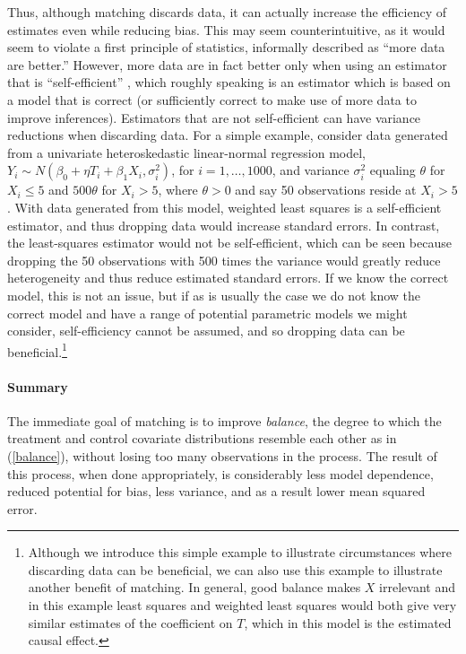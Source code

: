 \documentclass[11pt,titlepage]{article}
\begin{document}
Thus, although matching discards data, it can actually increase the
efficiency of estimates even while reducing bias.  This may seem
counterintuitive, as it would seem to violate a first principle of
statistics, informally described as ``more data are better.''
However, more data are in fact better only when using an estimator
that is ``self-efficient'' \citep{MenRom03}, which roughly speaking is
an estimator which is based on a model that is correct (or
sufficiently correct to make use of more data to improve inferences).
Estimators that are not self-efficient can have variance reductions
when discarding data.  For a simple example, consider data generated
from a univariate heteroskedastic linear-normal regression model,
$Y_i\sim N(\beta_0+\eta T_i+\beta_1 X_i,\sigma_i^2)$, for
$i=1,\dots,1000$, and variance $\sigma^2_i$ equaling $\theta$ for
$X_i\leq 5$ and $500\theta$ for $X_i>5$, where $\theta>0$ and say 50
observations reside at $X_i>5$.  With data generated from this model,
weighted least squares is a self-efficient estimator, and thus
dropping data would increase standard errors.  In contrast, the
least-squares estimator would not be self-efficient, which can be seen
because dropping the 50 observations with 500 times the variance would
greatly reduce heterogeneity and thus reduce estimated standard
errors.  If we know the correct model, this is not an issue, but if as
is usually the case we do not know the correct model and have a range
of potential parametric models we might consider, self-efficiency
cannot be assumed, and so dropping data can be
beneficial.\footnote{Although we introduce this simple example to
  illustrate circumstances where discarding data can be beneficial, we
  can also use this example to illustrate another benefit of matching.
  In general, good balance makes $X$ irrelevant and in this example
  least squares and weighted least squares would both give very
  similar estimates of the coefficient on $T$, which in this model is
  the estimated causal effect.}

\paragraph{Summary}
The immediate goal of matching is to improve \emph{balance}, the
degree to which the treatment and control covariate distributions
resemble each other as in (\ref{balance}), without losing too many
observations in the process.  The result of this process, when done
appropriately, is considerably less model dependence, reduced
potential for bias, less variance, and as a result lower mean squared
error.
\end{document}
